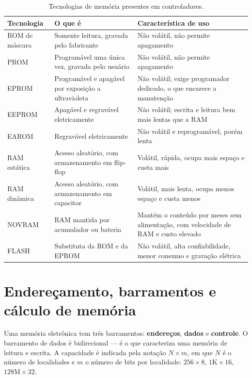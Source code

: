 \begin{table}[H]
  \centering
  \caption{Tecnologias de memória presentes em controladores.}
  \label{tab:tecnologias-memoria}
  \begin{tabular}{p{2.6cm} p{5.4cm} p{6.6cm}}
    \toprule
    Tecnologia & O que é & Característica de uso \\
    \midrule
    ROM de máscara
      & Somente leitura, gravada pelo fabricante
      & Não volátil, não permite apagamento \\
    PROM
      & Programável uma única vez, gravada pelo usuário
      & Não volátil, não permite apagamento \\
    EPROM
      & Programável e apagável por exposição a ultravioleta
      & Não volátil; exige programador dedicado, o que encarece a manutenção \\
    EEPROM
      & Apagável e regravável eletricamente
      & Não volátil; escrita e leitura bem mais lentas que a RAM \\
    EAROM
      & Regravável eletricamente
      & Não volátil e reprogramável, porém lenta \\
    RAM estática
      & Acesso aleatório, com armazenamento em flip-flop
      & Volátil, rápida, ocupa mais espaço e custa mais \\
    RAM dinâmica
      & Acesso aleatório, com armazenamento em capacitor
      & Volátil, mais lenta, ocupa menos espaço e custa menos \\
    NOVRAM
      & RAM mantida por acumulador ou bateria
      & Mantém o conteúdo por meses sem alimentação, com velocidade de RAM e custo elevado \\
    FLASH
      & Substituta da ROM e da EPROM
      & Não volátil, alta confiabilidade, menor consumo e gravação elétrica \\
    \bottomrule
  \end{tabular}
\end{table}

\section{Endereçamento, barramentos e cálculo de memória}

Uma memória eletrônica tem três barramentos: \textbf{endereços}, \textbf{dados} e
\textbf{controle}. O barramento de dados é bidirecional --- é o que caracteriza uma memória de
leitura e escrita. A capacidade é indicada pela notação $N \times m$, em que $N$ é o número de
localidades e $m$ o número de bits por localidade: $256\times8$, $1\text{K}\times16$,
$128\text{M}\times32$.

